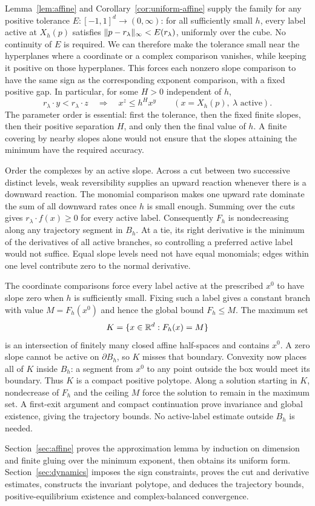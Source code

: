 Lemma~\ref{lem:affine} and Corollary~\ref{cor:uniform-affine} supply the
family for any positive tolerance $E:[-1,1]^d\to(0,\infty)$:
for all sufficiently small $h$, every label active at $X_h(p)$ satisfies
$\lVert p-r_\lambda\rVert_\infty<E(r_\lambda)$, uniformly over the cube.
No continuity of $E$ is required. We can therefore make the tolerance
small near the hyperplanes where a coordinate or a complex comparison
vanishes, while keeping it positive on those hyperplanes. This forces
each nonzero slope comparison to have the same sign as the corresponding
exponent comparison, with a fixed positive gap. In particular, for some
$H>0$ independent of $h$,
\[
 r_\lambda\cdot y<r_\lambda\cdot z
 \quad\Longrightarrow\quad x^z\le h^H x^y
 \qquad(x=X_h(p),\ \lambda\text{ active}).
\]
The parameter order is essential: first the tolerance, then the fixed
finite slopes, then their positive separation $H$, and only then the
final value of $h$. A finite covering by nearby slopes alone would not
ensure that the slopes attaining the minimum have the required accuracy.

Order the complexes by an active slope. Across a cut between two
successive distinct levels, weak reversibility supplies an upward reaction
whenever there is a downward reaction. The monomial comparison makes one
upward rate dominate the sum of all downward rates once $h$ is small
enough. Summing over the cuts gives $r_\lambda\cdot f(x)\ge0$ for
every active label. Consequently $F_h$ is nondecreasing along any
trajectory segment in $B_h$. At a tie, its right derivative is the
minimum of the derivatives of all active branches, so controlling a
preferred active label would not suffice. Equal slope levels need not
have equal monomials; edges within one level contribute zero to the
normal derivative.

The coordinate comparisons force every label active at the prescribed
$x^0$ to have slope zero when $h$ is sufficiently small. Fixing such a
label gives a constant branch with value $M=F_h(x^0)$ and hence the
global bound $F_h\le M$. The maximum set
\[
 K=\{x\in\mathbb R^d:F_h(x)=M\}
\]
is an intersection of finitely many closed affine half-spaces and
contains $x^0$. A zero slope cannot be active on $\partial B_h$, so
$K$ misses that boundary. Convexity now places all of $K$ inside $B_h$:
a segment from $x^0$ to any point outside the box would meet its boundary.
Thus $K$ is a compact positive polytope. Along a solution starting in
$K$, nondecrease of $F_h$ and the ceiling $M$ force the solution to
remain in the maximum set. A first-exit argument and compact continuation
prove invariance and global existence, giving the trajectory bounds.
No active-label estimate outside $B_h$ is needed.

Section~\ref{sec:affine} proves the approximation lemma by induction on
dimension and finite gluing over the minimum exponent, then obtains its
uniform form. Section~\ref{sec:dynamics} imposes the sign constraints,
proves the cut and derivative estimates, constructs the invariant polytope,
and deduces the trajectory bounds, positive-equilibrium existence and
complex-balanced convergence.
